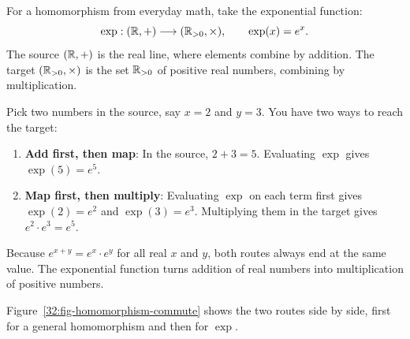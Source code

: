 \begin{intuitionbox}
For a homomorphism from everyday math, take the exponential function:
\[
\exp: (\mathbb{R}, +) \longrightarrow (\mathbb{R}_{>0}, \times), \qquad \exp(x) = e^x.
\]
The source $(\mathbb{R}, +)$ is the real line, where elements combine by addition. The target $(\mathbb{R}_{>0}, \times)$ is the set $\mathbb{R}_{>0}$ of positive real numbers, combining by multiplication.

Pick two numbers in the source, say $x = 2$ and $y = 3$. You have two ways to reach the target:
\begin{enumerate}
  \item \textbf{Add first, then map}: In the source, $2 + 3 = 5$. Evaluating $\exp$ gives $\exp(5) = e^5$.
  \item \textbf{Map first, then multiply}: Evaluating $\exp$ on each term first gives $\exp(2) = e^2$ and $\exp(3) = e^3$. Multiplying them in the target gives $e^2 \cdot e^3 = e^5$.
\end{enumerate}
Because $e^{x+y} = e^x \cdot e^y$ for all real $x$ and $y$, both routes always end at the same value. The exponential function turns addition of real numbers into multiplication of positive numbers.
\end{intuitionbox}

Figure~\ref{32:fig-homomorphism-commute} shows the two routes side by side, first for a general homomorphism and then for $\exp$.

